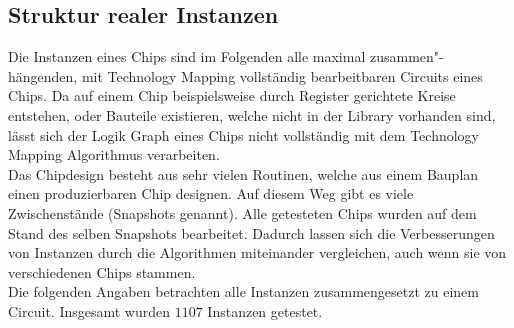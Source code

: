 \documentclass[11pt, a4paper, german]{article}
\newcommand{\TM}{Technology  Mapping }
\begin{document}
 \subsection{Struktur realer Instanzen}
\label{subsec:struktur_realer_instanzen} 
 Die Instanzen eines Chips sind im Folgenden alle maximal zusammen"-h\"angen\-den, mit \TM vollständig bearbeitbaren Circuits eines Chips. Da auf einem Chip beispielsweise durch Register gerichtete Kreise entstehen, oder Bauteile existieren, welche nicht in der Library vorhanden sind, lässt sich der Logik Graph eines Chips nicht vollständig mit dem \TM Algorithmus verarbeiten. \\
 Das Chipdesign besteht aus sehr vielen Routinen, welche aus einem Bauplan einen produzierbaren Chip designen. Auf diesem Weg gibt es viele Zwischenstände (Snapshots genannt). Alle getesteten Chips wurden auf dem Stand  des selben Snapshots bearbeitet. Dadurch lassen sich die Verbesserungen von Instanzen durch die Algorithmen miteinander vergleichen, auch wenn sie von verschiedenen Chips stammen.\\
 Die folgenden Angaben betrachten alle Instanzen zusammengesetzt zu einem Circuit.
 Insgesamt wurden $1107$ Instanzen getestet. \\
\end{document}
